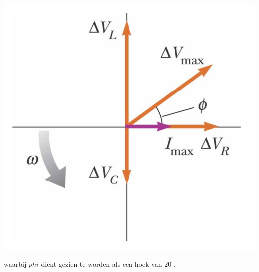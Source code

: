 \begin{description}[labelwidth=1.5cm, leftmargin=!]
\begin{center}
            \includegraphics[scale = 0.3]{oz09/resources/Oef1Fasor.png}
        \end{center}
        waarbij $phi$ dient gezien te worden als een hoek van $20^\circ$.
\end{description}

\vspace{1cm}